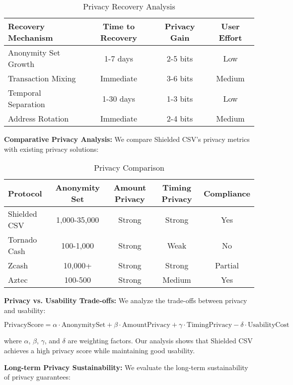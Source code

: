 \documentclass[11pt,a4paper]{article}
\begin{document}
\begin{table}[h]
\centering
\caption{Privacy Recovery Analysis}
\begin{tabular}{|l|c|c|c|}
\hline
\textbf{Recovery Mechanism} & \textbf{Time to Recovery} & \textbf{Privacy Gain} & \textbf{User Effort} \\
\hline
Anonymity Set Growth & 1-7 days & 2-5 bits & Low \\
Transaction Mixing & Immediate & 3-6 bits & Medium \\
Temporal Separation & 1-30 days & 1-3 bits & Low \\
Address Rotation & Immediate & 2-4 bits & Medium \\
\hline
\end{tabular}
\end{table}

\textbf{Comparative Privacy Analysis:}
We compare Shielded CSV's privacy metrics with existing privacy solutions:

\begin{table}[h]
\centering
\caption{Privacy Comparison}
\begin{tabular}{|l|c|c|c|c|}
\hline
\textbf{Protocol} & \textbf{Anonymity Set} & \textbf{Amount Privacy} & \textbf{Timing Privacy} & \textbf{Compliance} \\
\hline
Shielded CSV & 1,000-35,000 & Strong & Strong & Yes \\
Tornado Cash & 100-1,000 & Strong & Weak & No \\
Zcash & 10,000+ & Strong & Strong & Partial \\
Aztec & 100-500 & Strong & Medium & Yes \\
\hline
\end{tabular}
\end{table}

\textbf{Privacy vs. Usability Trade-offs:}
We analyze the trade-offs between privacy and usability:

\begin{equation}
\text{PrivacyScore} = \alpha \cdot \text{AnonymitySet} + \beta \cdot \text{AmountPrivacy} + \gamma \cdot \text{TimingPrivacy} - \delta \cdot \text{UsabilityCost}
\end{equation}

where $\alpha$, $\beta$, $\gamma$, and $\delta$ are weighting factors. Our analysis shows that Shielded CSV achieves a high privacy score while maintaining good usability.

\textbf{Long-term Privacy Sustainability:}
We evaluate the long-term sustainability of privacy guarantees:
\end{document}
